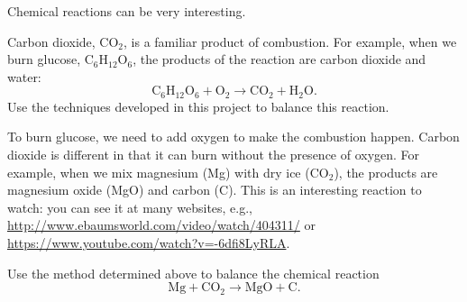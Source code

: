 \begin{pactivity} Chemical reactions can be very interesting. 
\ba
\item Carbon dioxide, $\text{CO}_2$, is a familiar product of combustion. For example, when we burn glucose, $\text{C}_6\text{H}_{12}\text{O}_6$, the products of the reaction are carbon dioxide and water:
\begin{equation}
\text{C}_6\text{H}_{12}\text{O}_6 + \text{O}_2 \to \text{CO}_2 + \text{H}_2\text{O}.\label{eq:reaction2}
\end{equation}
Use the techniques developed in this project to balance this reaction.

\item To burn glucose, we need to add oxygen to make the combustion happen. Carbon dioxide is different in that it can burn without the presence of oxygen. For example, when we mix magnesium (Mg) with dry ice ($\text{CO}_2$), the products are magnesium oxide (MgO) and carbon (C). This is an interesting reaction to watch: you can see it at many websites, e.g.,
\url{http://www.ebaumsworld.com/video/watch/404311/} or 
\url{https://www.youtube.com/watch?v=-6dfi8LyRLA}.

Use the method determined above to balance the chemical reaction 
\begin{equation}
\text{Mg} + \text{CO}_2 \to \text{MgO} + \text{C}. \label{eq:reaction3}
\end{equation}

\ea

\end{pactivity}




